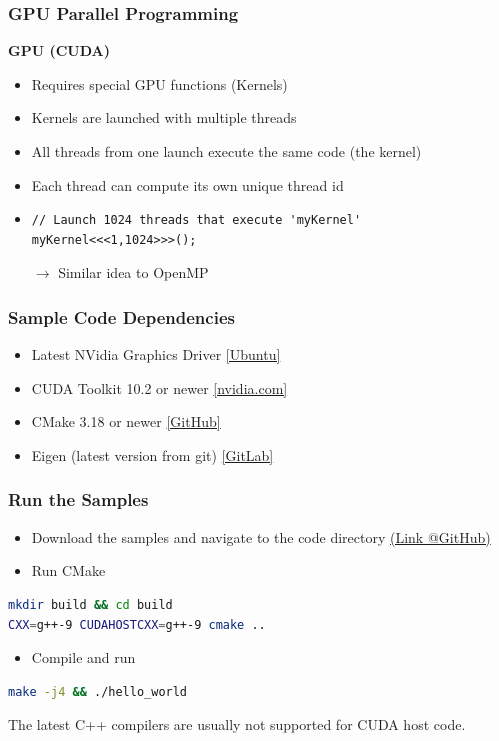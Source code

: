\documentclass[aspectratio=169]{beamer}
\begin{document}
\begin{frame} [fragile]
	\frametitle{GPU Parallel Programming}

	\textbf{GPU (CUDA)}
		\begin{itemize}
			\item Requires special GPU functions (Kernels)
			\item Kernels are launched with multiple threads
			\item All threads from one launch execute the same code (the kernel)
			\item Each thread can compute its own unique thread id
			\item %
\begin{lstlisting} 
// Launch 1024 threads that execute 'myKernel'
myKernel<<<1,1024>>>();
\end{lstlisting}
			\item[$\rightarrow$] Similar idea to OpenMP
		\end{itemize}
\end{frame}




\begin{frame} [fragile]
	\frametitle{Sample Code Dependencies}
		\begin{itemize}
			\item Latest NVidia Graphics Driver \href{https://launchpad.net/~graphics-drivers/+archive/ubuntu/ppa}{[Ubuntu]}
			\item CUDA Toolkit 10.2 or newer \href{https://developer.nvidia.com/cuda-downloads}{[nvidia.com]}
			\item CMake 3.18 or newer \href{https://github.com/Kitware/CMake/tags}{[GitHub]}
			\item Eigen (latest version from git) \href{https://gitlab.com/libeigen/eigen}{[GitLab]}
		\end{itemize}
\end{frame}



\begin{frame}[fragile]
\frametitle{Run the Samples}
\begin{itemize}
	\item Download the samples and navigate to the code directory \href{https://github.com/darglein/saiga/tree/master/samples/cuda/helloCuda}{(Link @GitHub)}
	\item Run CMake 
\end{itemize}
\begin{lstlisting}[language=bash]
mkdir build && cd build
CXX=g++-9 CUDAHOSTCXX=g++-9 cmake ..
\end{lstlisting}
\begin{itemize}
	\item Compile and run
\end{itemize}
\begin{lstlisting}[language=bash]
make -j4 && ./hello_world
\end{lstlisting}

\begin{mdframed}[frametitle=Note:]
	The latest C++ compilers are usually not supported for CUDA host code.
\end{mdframed}
	
\end{frame}
\end{document}
